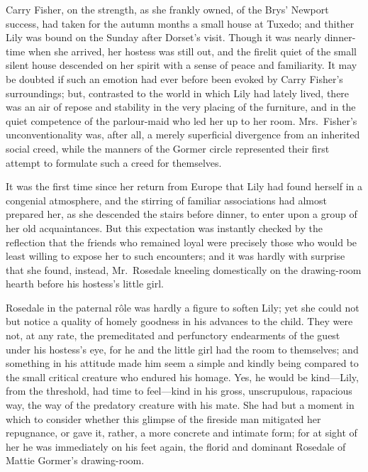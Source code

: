 \documentclass[12pt,a4paper]{book}
\begin{document}
Carry Fisher, on the strength, as she frankly owned, of the Brys'
Newport success, had taken for the autumn months a small house at
Tuxedo; and thither Lily was bound on the Sunday after Dorset's
visit. Though it was nearly dinner-time when she arrived, her
hostess was still out, and the firelit quiet of the small silent
house descended on her spirit with a sense of peace and
familiarity. It may be doubted if such an emotion had ever before
been evoked by Carry Fisher's surroundings; but, contrasted to
the world in which Lily had lately lived, there was an air of
repose and stability in the very placing of the furniture, and in
the quiet competence of the parlour-maid who led her up to her
room. Mrs.\ Fisher's unconventionality was, after all, a merely
superficial divergence from an inherited social creed, while the
manners of the Gormer circle represented their first attempt to
formulate such a creed for themselves.





It was the first time since her return from Europe that Lily had
found herself in a congenial atmosphere, and the stirring of
familiar associations had almost prepared her, as she descended
the stairs before dinner, to enter upon a group of her old
acquaintances. But this expectation was instantly checked by the
reflection that the friends who remained loyal were precisely
those who would be least willing to expose her to such
encounters; and it was hardly with surprise that she found,
instead, Mr.\ Rosedale kneeling domestically on the drawing-room
hearth before his hostess's little girl.





Rosedale in the paternal r\^{o}le was hardly a figure to soften Lily;
yet she could not but notice a quality of homely goodness in his
advances to the child. They were not, at any rate, the
premeditated and perfunctory endearments of the guest under his
hostess's eye, for he and the little girl had the room to
themselves; and something in his attitude made him seem a simple
and kindly being compared to the small critical creature who
endured his homage. Yes, he would be kind---Lily, from the
threshold, had time to feel---kind in his gross, unscrupulous,
rapacious way, the way of the predatory creature with his mate. 
She had but a moment in which to consider whether this glimpse of
the fireside man mitigated her repugnance, or gave it, rather, a
more concrete and intimate form; for at sight of her he was
immediately on his feet again, the florid and dominant Rosedale
of Mattie Gormer's drawing-room.
\end{document}
